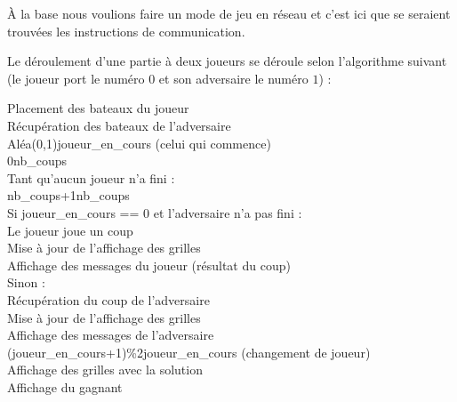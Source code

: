 \medskip

À la base nous voulions faire un mode de jeu en réseau et c'est ici que se seraient trouvées les instructions de communication.

\newpage

Le déroulement d'une partie à deux joueurs se déroule selon l'algorithme suivant (le joueur port le numéro $0$ et son adversaire le numéro $1$) :

\begin{algo1}\label{alogo_jeu}
Placement des bateaux du joueur\\
Récupération des bateaux de l'adversaire\\
Aléa(0,1)\sto joueur\_en\_cours (celui qui commence)\\
0\sto nb\_coups\\
Tant qu'aucun joueur n'a fini :\\
nb\_coups+1\sto nb\_coups\\
Si joueur\_en\_cours == 0 et l'adversaire n'a pas fini :\\
Le joueur joue un coup\\
Mise à jour de l'affichage des grilles\\
Affichage des messages du joueur (résultat du coup)\\
Sinon :\\
Récupération du coup de l'adversaire\\
Mise à jour de l'affichage des grilles\\
Affichage des messages de l'adversaire\\
(joueur\_en\_cours+1)\%2\sto joueur\_en\_cours (changement de joueur)\\
Affichage des grilles avec la solution\\
Affichage du gagnant\\
\end{algo1}